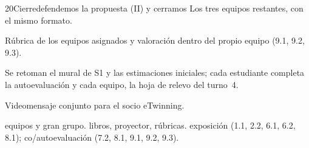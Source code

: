 \begin{sesionbox}{20}{Cierre}{defendemos la propuesta (II) y cerramos}
 Los tres equipos restantes, con el mismo formato.

 Rúbrica de los equipos asignados y valoración dentro del propio equipo (9.1, 9.2, 9.3).

 Se retoman el mural de S1 y las estimaciones iniciales; cada estudiante completa la autoevaluación y cada equipo, la hoja de relevo del turno~4.

 Videomensaje conjunto para el socio eTwinning.

 equipos y gran grupo.  libros, proyector, rúbricas.  exposición (1.1, 2.2, 6.1, 6.2, 8.1); co/autoevaluación (7.2, 8.1, 9.1, 9.2, 9.3).
\end{sesionbox}
